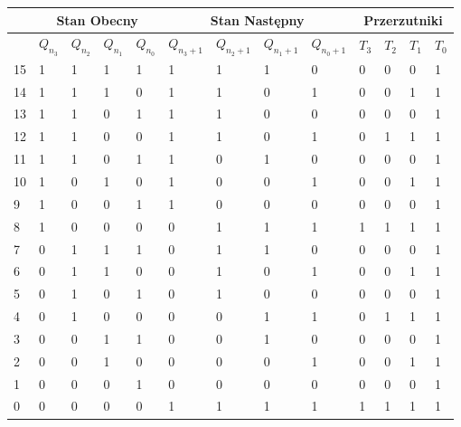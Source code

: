\documentclass[a4paper]{article}
\begin{document}
\begin{center}
    \begin{tabular}{|l|l|l|l|l||l|l|l|l||l|l|l|l|}
    \hline
    &\multicolumn{4}{c||}{Stan Obecny} & \multicolumn{4}{|c||}{Stan Następny} & \multicolumn{4}{|c|}{Przerzutniki} \\\hline
       &$Q_{n_3}$ & $Q_{n_2}$ & $Q_{n_1}$ & $Q_{n_0}$ & $Q_{n_3+1}$ & $Q_{n_2+1}$ & $Q_{n_1+1}$ &$Q_{n_0+1}$ & $T_3$ & $T_2$ & $T_1$ & $T_0$ \\ \hline
    15 & 1 & 1 & 1 & 1 & 1 & 1 & 1 & 0 & 0 & 0 & 0 & 1 \\ \hline
    14 & 1 & 1 & 1 & 0 & 1 & 1 & 0 & 1 & 0 & 0 & 1 & 1 \\ \hline
    13 & 1 & 1 & 0 & 1 & 1 & 1 & 0 & 0 & 0 & 0 & 0 & 1 \\ \hline
    12 & 1 & 1 & 0 & 0 & 1 & 1 & 0 & 1 & 0 & 1 & 1 & 1 \\ \hline
    11 & 1 & 1 & 0 & 1 & 1 & 0 & 1 & 0 & 0 & 0 & 0 & 1 \\ \hline
    10 & 1 & 0 & 1 & 0 & 1 & 0 & 0 & 1 & 0 & 0 & 1 & 1 \\ \hline
    9  & 1 & 0 & 0 & 1 & 1 & 0 & 0 & 0 & 0 & 0 & 0 & 1 \\ \hline
    8  & 1 & 0 & 0 & 0 & 0 & 1 & 1 & 1 & 1 & 1 & 1 & 1 \\ \hline
    7  & 0 & 1 & 1 & 1 & 0 & 1 & 1 & 0 & 0 & 0 & 0 & 1 \\ \hline
    6  & 0 & 1 & 1 & 0 & 0 & 1 & 0 & 1 & 0 & 0 & 1 & 1 \\ \hline
    5  & 0 & 1 & 0 & 1 & 0 & 1 & 0 & 0 & 0 & 0 & 0 & 1 \\ \hline
    4  & 0 & 1 & 0 & 0 & 0 & 0 & 1 & 1 & 0 & 1 & 1 & 1 \\ \hline
    3  & 0 & 0 & 1 & 1 & 0 & 0 & 1 & 0 & 0 & 0 & 0 & 1 \\ \hline
    2  & 0 & 0 & 1 & 0 & 0 & 0 & 0 & 1 & 0 & 0 & 1 & 1 \\ \hline
    1  & 0 & 0 & 0 & 1 & 0 & 0 & 0 & 0 & 0 & 0 & 0 & 1 \\ \hline
    0  & 0 & 0 & 0 & 0 & 1 & 1 & 1 & 1 & 1 & 1 & 1 & 1 \\ \hline
    \end{tabular}
    \end{center}
\end{document}
